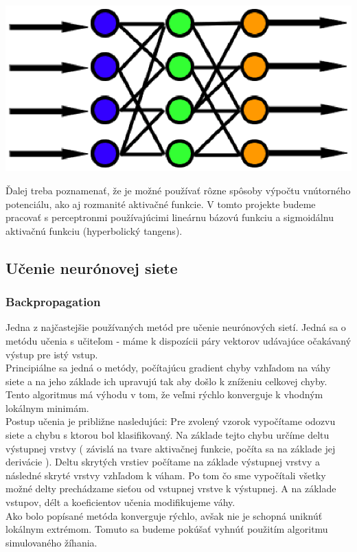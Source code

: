 \documentclass[11pt,a4paper]{article}
\begin{document}
\begin{center}
\includegraphics[scale=0.7]{ffn.ps}\\
\end{center}
Ďalej treba poznamenať, že je možné používať rôzne spôsoby výpočtu vnútorného potenciálu, ako aj rozmanité aktivačné funkcie. V tomto projekte budeme pracovať s perceptronmi používajúcimi lineárnu bázovú funkciu a sigmoidálnu aktivačnú funkciu (hyperbolický tangens).
\subsection{Učenie neurónovej siete}
\subsubsection{Backpropagation}
Jedna z najčastejšie používaných metód pre učenie neurónových sietí. Jedná sa o metódu učenia s učiteľom - máme k dispozícii páry vektorov udávajúce očakávaný výstup pre istý vstup. \\
Principiálne sa jedná o metódy, počítajúcu gradient chyby vzhľadom na váhy siete a na jeho základe ich upravujú tak aby došlo k zníženiu celkovej chyby. Tento algoritmus má výhodu v tom, že veľmi rýchlo konverguje k vhodným lokálnym minimám.\\
Postup učenia je približne nasledujúci: Pre zvolený vzorok vypočítame odozvu siete a chybu s ktorou bol klasifikovaný. Na základe tejto chybu určíme deltu výstupnej vrstvy ( závislá na tvare aktivačnej funkcie, počíta sa na základe jej derivácie ). Deltu skrytých vrstiev počítame na základe výstupnej vrstvy a následné skryté vrstvy vzhľadom k váham. Po tom čo sme vypočítali všetky možné delty prechádzame sieťou od vstupnej vrstve k výstupnej. A na základe vstupov, délt a koeficientov učenia modifikujeme váhy.\\
Ako bolo popísané metóda konverguje rýchlo, avšak nie je schopná uniknúť lokálnym extrémom. Tomuto sa budeme pokúšať vyhnúť použitím algoritmu simulovaného žíhania.
\end{document}
